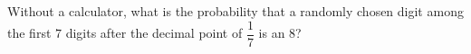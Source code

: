 Without a calculator, what is the probability that a randomly chosen digit among the first $7$ digits after the decimal point of $\dfrac17$ is an $8$?
